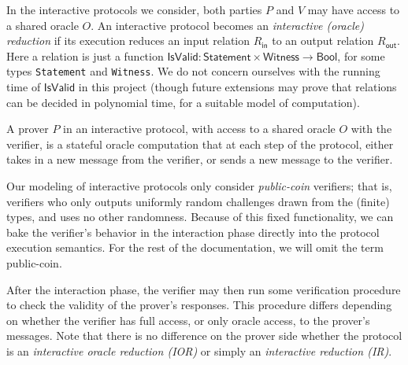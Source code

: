 In the interactive protocols we consider, both parties $P$ and $V$ may have access to a shared oracle $O$. An interactive protocol becomes an \emph{interactive (oracle) reduction} if its execution reduces an input relation $R_{\mathsf{in}}$ to an output relation $R_{\mathsf{out}}$. Here a relation is just a function $\mathsf{IsValid}: \mathsf{Statement} \times \mathsf{Witness} \to \mathsf{Bool}$, for some types \verb|Statement| and \verb|Witness|. We do not concern ourselves with the running time of $\mathsf{IsValid}$ in this project (though future extensions may prove that relations can be decided in polynomial time, for a suitable model of computation).

\begin{definition}
    \label{def:prover_type_signature}
    A prover $P$ in an interactive protocol, with access to a shared oracle $O$ with the verifier, is a stateful oracle computation that at each step of the protocol, either takes in a new message from the verifier, or sends a new message to the verifier.
\end{definition}

Our modeling of interactive protocols only consider \emph{public-coin} verifiers; that is, verifiers who only outputs uniformly random challenges drawn from the (finite) types, and uses no other randomness. Because of this fixed functionality, we can bake the verifier's behavior in the interaction phase directly into the protocol execution semantics. For the rest of the documentation, we will omit the term public-coin.

After the interaction phase, the verifier may then run some verification procedure to check the validity of the prover's responses. This procedure differs depending on whether the verifier has full access, or only oracle access, to the prover's messages. Note that there is no difference on the prover side whether the protocol is an \emph{interactive oracle reduction (IOR)} or simply an \emph{interactive reduction (IR)}.

\begin{definition}
    \label{def:verifier_type_signature}
    
\end{definition}

\begin{definition}
    \label{def:oracle_verifier_type_signature}
\end{definition}

